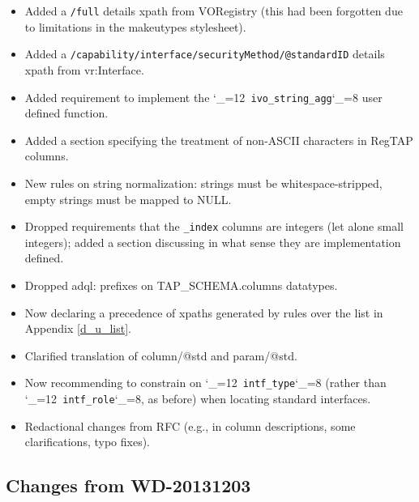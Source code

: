 \documentclass[11pt,a4paper]{ivoa}
\makeatletter
\def\rtent#1{\texttt{\color{rtcolor}\verb|#1|}}
\def\makeunderscoreletter{\catcode`\_=12}
\def\makeunderscoresubscript{\catcode`\_=8}
\def\rtent{\makeunderscoreletter\relax\rt@nt}
\def\rt@nt#1{\texttt{\color{rtcolor} #1}\makeunderscoresubscript{}}
\makeatother
\begin{document}
\begin{itemize}

\item Added a \texttt{/full} details xpath from VORegistry (this had
  been forgotten due to limitations in the makeutypes stylesheet).{}

\item Added a \texttt{/capability/interface/securityMethod/@standardID}
  details xpath from vr:Interface.{}

\item Added requirement to implement the \rtent{ivo_string_agg}
  user defined function.{}

\item Added a section specifying the treatment of non-ASCII characters
  in RegTAP columns.{}

\item New rules on string normalization: strings must be
  whitespace-stripped, empty strings must be mapped to NULL.{}

\item Dropped requirements that the \texttt{\_index} columns are
  integers (let alone small integers); added a section discussing in
  what sense they are implementation defined.{}

\item Dropped adql: prefixes on TAP\_SCHEMA.columns datatypes.{}

\item Now declaring a precedence of xpaths generated by rules over the
  list in Appendix \ref{d_u_list}.{}

\item Clarified translation of column/@std and param/@std.{}

\item Now recommending to constrain on \rtent{intf_type}
  (rather than \rtent{intf_role}, as before) when locating standard
  interfaces.{}

\item Redactional changes from RFC (e.g., in column descriptions, some
  clarifications, typo fixes).{}


\end{itemize}

\subsection{Changes from WD-20131203}

\label{changes-20131203}
\end{document}
